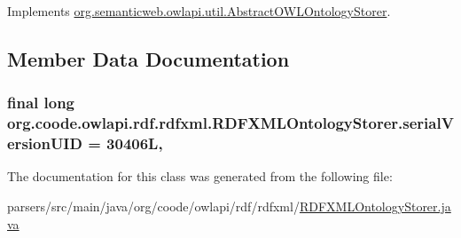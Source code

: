 Implements \hyperlink{classorg_1_1semanticweb_1_1owlapi_1_1util_1_1_abstract_o_w_l_ontology_storer_af2b614d520f12955394f4762a3542021}{org.\-semanticweb.\-owlapi.\-util.\-Abstract\-O\-W\-L\-Ontology\-Storer}.



\subsection{Member Data Documentation}
\hypertarget{classorg_1_1coode_1_1owlapi_1_1rdf_1_1rdfxml_1_1_r_d_f_x_m_l_ontology_storer_a1055e22709665d7210f3565abfc41e9d}{
\subsubsection[{serial\-Version\-U\-I\-D}]{\setlength{\rightskip}{0pt plus 5cm}final long org.\-coode.\-owlapi.\-rdf.\-rdfxml.\-R\-D\-F\-X\-M\-L\-Ontology\-Storer.\-serial\-Version\-U\-I\-D = 30406\-L\hspace{0.3cm}{\ttfamily [static]}, {\ttfamily [private]}}}\label{classorg_1_1coode_1_1owlapi_1_1rdf_1_1rdfxml_1_1_r_d_f_x_m_l_ontology_storer_a1055e22709665d7210f3565abfc41e9d}


The documentation for this class was generated from the following file\-:\begin{DoxyCompactItemize}
\item 
parsers/src/main/java/org/coode/owlapi/rdf/rdfxml/\hyperlink{_r_d_f_x_m_l_ontology_storer_8java}{R\-D\-F\-X\-M\-L\-Ontology\-Storer.\-java}\end{DoxyCompactItemize}
